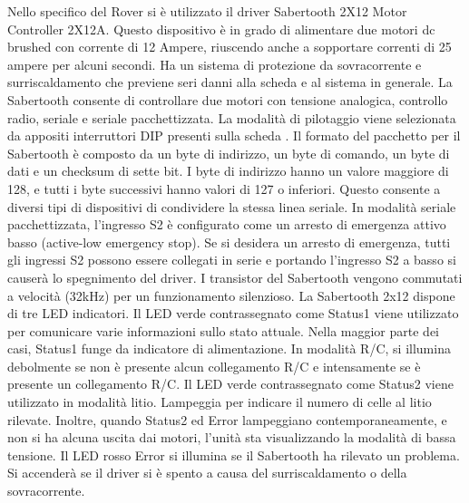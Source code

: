 \documentclass{article}
\begin{document}
Nello specifico del Rover si è utilizzato il driver Sabertooth 2X12 Motor Controller 2X12A. 
 Questo dispositivo è in grado di alimentare due motori dc
brushed con corrente di 12 Ampere, riuscendo anche a sopportare correnti di 25 ampere per alcuni secondi. Ha un sistema di
protezione da sovracorrente e surriscaldamento che previene seri danni alla scheda e al sistema in generale.
La Sabertooth consente di controllare due motori con tensione analogica, controllo radio, seriale e seriale pacchettizzata. La
modalità di pilotaggio viene selezionata da appositi interruttori DIP presenti sulla scheda .
Il formato del pacchetto per il Sabertooth è composto da un byte di indirizzo, un byte di comando, un byte di dati e un checksum di
sette bit. I byte di indirizzo hanno un valore maggiore di 128, e tutti i byte successivi hanno valori di 127 o inferiori. Questo consente
a diversi tipi di dispositivi di condividere la stessa linea seriale.
In modalità seriale pacchettizzata, l'ingresso S2 è configurato come un arresto di emergenza attivo basso (active-low emergency
stop). Se si desidera un arresto di emergenza, tutti gli ingressi S2 possono essere collegati in serie e portando l'ingresso S2 a
basso si causerà lo spegnimento del driver.
I transistor del Sabertooth vengono commutati a velocità (32kHz) per un funzionamento silenzioso.
La Sabertooth 2x12 dispone di tre LED indicatori.
Il LED verde contrassegnato come Status1 viene utilizzato per comunicare varie informazioni sullo stato attuale. Nella maggior
parte dei casi, Status1 funge da indicatore di alimentazione. In modalità R/C, si illumina debolmente se non è presente alcun
collegamento R/C e intensamente se è presente un collegamento R/C.
Il LED verde contrassegnato come Status2 viene utilizzato in modalità litio. Lampeggia per indicare il numero di celle al litio rilevate.
Inoltre, quando Status2 ed Error lampeggiano contemporaneamente, e non si ha alcuna uscita dai motori, l'unità sta visualizzando
la modalità di bassa tensione.
Il LED rosso Error si illumina se il Sabertooth ha rilevato un problema. Si accenderà se il driver si è spento a causa del
surriscaldamento o della sovracorrente.
\end{document}
